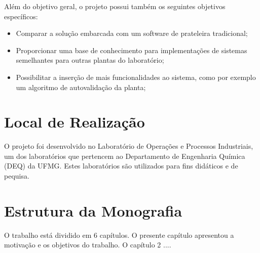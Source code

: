 	Além do objetivo geral, o projeto possui também os seguintes objetivos específicos:
	
	\begin{itemize}
		\item 
		Comparar a solução embarcada com um software de prateleira tradicional;
		\item 
		Proporcionar uma base de conhecimento para implementações de sistemas semelhantes para outras plantas do laboratório;
		\item 
		Possibilitar a inserção de mais funcionalidades ao sistema, como por exemplo um algoritmo de autovalidação da planta;
	\end{itemize}
	

\section{Local de Realização}
	O projeto foi desenvolvido no Laboratório de Operações e Processos Industriais, um dos laboratórios que pertencem ao Departamento de Engenharia Química (DEQ) da UFMG. Estes laboratórios são utilizados para fins didáticos e de pequisa.

\section{Estrutura da Monografia}
	O trabalho está dividido em 6 capítulos. O presente capítulo apresentou a motivação e os objetivos do trabalho. O capítulo 2 .... 